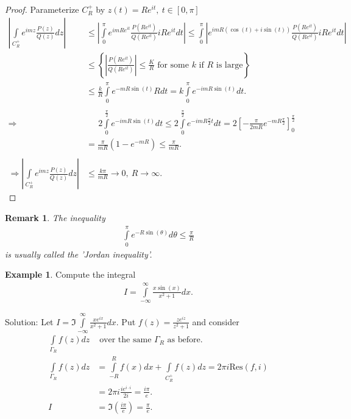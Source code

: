\documentclass[12pt, a4paper]{article}
\theoremstyle{plain}
\newtheorem{rem}{Remark}
\theoremstyle{definition}
\newtheorem{example}{Example} %
\begin{document}
		\begin{proof}
			Parameterize $C_R^+$ by $z(t) = Re^{it},\:t\in[0,\pi]$
			\begin{align*}
				\left|\int\limits_{C_R^+}e^{imz}\frac{P(z)}{Q(z)}dz\right| &\le
				\left|\int\limits_{0}^{\pi}e^{imRe^{it}}\frac{P(Re^{it})}{Q(Re^{it})}iRe^{it}dt\right| \le
				\int\limits_{0}^{\pi}\left|e^{imR(\cos(t)+i\sin(t))}\frac{P(Re^{it})}{Q(Re^{it})}iRe^{it}dt\right|\\ &\le
				\left\{\left|\frac{P(Re^{it})}{Q(Re^{it})}\right|\le \frac{K}{R}\text{ for some $k$ if $R$ is large}\right\} \\ &\le
				\frac{k}{R}\int\limits_{0}^{\pi}e^{-mR\sin(t)}Rdt =
				k\int\limits_{0}^{\pi}e^{-imR\sin(t)}dt. \\\\ \Rightarrow&\quad\:\:
				2\int\limits_{0}^{\frac{\pi}{2}}e^{-imR\sin(t)}dt \le 
				2\int\limits_{0}^{\frac{\pi}{2}}e^{-imR \frac{\pi}{2}t}dt= 
				2\left[- \frac{\pi}{2mR}e^{-mR \frac{\pi}{2}}\right]_0^{\frac{\pi}{2}}\\ &=
				\frac{\pi}{mR}\left(1-e^{-mR}\right) \le
				\frac{\pi}{mR}.\\\\ \Rightarrow 
				\left|\int\limits_{C_R^+}e^{imz}\frac{P(z)}{Q(z)}dz\right| &\le
				\frac{k\pi}{mR}\to 0,\:R\to\infty.
			\end{align*}
		\end{proof}

		\begin{rem}
			The inequality
			\begin{align*}
				\int\limits_{0}^{\pi}e^{-R\sin(\theta)}d\theta \le \frac{\pi}{R}
			\end{align*}
			is usually called the 'Jordan inequality'.\\
		\end{rem}

		\begin{example}
			Compute the integral
			\begin{align*}
				I = \int\limits_{-\infty}^{\infty}\frac{x\sin(x)}{x^2+1}dx.
			\end{align*}

			Solution: Let $\displaystyle I = \Im\int\limits_{-\infty}^{\infty}\frac{xe^{ix}}{x^2+1}dx$. Put $\displaystyle f(z) = \frac{ze^{iz}}{z^2+1}$ and consider
			\begin{align*}
				\int\limits_{\Gamma_R}f(z)dz &\text{ over the same $\Gamma_R$ as before.}\\
				\int\limits_{\Gamma_R}f(z)dz &= 
				\int\limits_{-R}^{R}f(x)dx + \int\limits_{C_R^+}f(z)dz = 
				2\pi i \mathrm{Res}(f,i)\\  &= 
				2\pi i \frac{ie^{i\cdot i}}{2i} = \frac{i\pi}{e}.\\ I &=
				\Im\left(\frac{i\pi}{e}\right) = \frac{\pi}{e}.
			\end{align*}
		\end{example}
\end{document}
